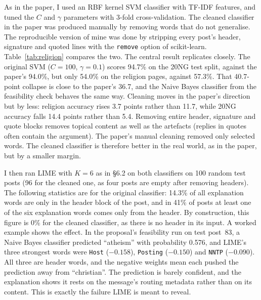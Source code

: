 \documentclass[11pt]{article}
\newcommand{\tok}[1]{\texttt{#1}}
\begin{document}
As in the paper, I used an RBF kernel SVM classifier with TF-IDF features, and tuned the $C$ and $\gamma$ parameters with 3-fold cross-validation. The cleaned classifier in the paper was produced manually by removing words that do not generalise. The reproducible version of mine was done by stripping every post's header, signature and quoted lines with the \tok{remove} option of scikit-learn. Table~\ref{tab:religion} compares the two. The central result replicates closely. The original SVM ($C = 100$, $\gamma = 0.1$) scores 94.7\% on the 20NG test split, against the paper's 94.0\%, but only 54.0\% on the religion pages, against 57.3\%. That 40.7-point collapse is close to the paper's 36.7, and the Naive Bayes classifier from the feasibility check behaves the same way. Cleaning moves in the paper's direction but by less: religion accuracy rises 3.7 points rather than 11.7, while 20NG accuracy falls 14.4 points rather than 5.4. Removing entire header, signature and quote blocks removes topical content as well as the artefacts (replies in quotes often contain the argument). The paper’s manual cleaning removed only selected words. The cleaned classifier is therefore better in the real world, as in the paper, but by a smaller margin.

I then ran LIME with $K = 6$ as in \S6.2 on both classifiers on 100 random test posts (96 for the cleaned one, as four posts are empty after removing headers). The following statistics are for the original classifier: 14.3\% of all explanation words are only in the header block of the post, and in 41\% of posts at least one of the six explanation words comes only from the header. By construction, this figure is 0\% for the cleaned classifier, as there is no header in its input. A worked example shows the effect. In the proposal's feasibility run on test post~83, a Naive Bayes classifier predicted ``atheism'' with probability 0.576, and LIME's three strongest words were \tok{Host} ($-0.158$), \tok{Posting} ($-0.150$) and \tok{NNTP} ($-0.090$). All three are header words, and the negative weights mean each pushed the prediction away from ``christian''. The prediction is barely confident, and the explanation shows it rests on the message's routing metadata rather than on its content. This is exactly the failure LIME is meant to reveal.
\end{document}
